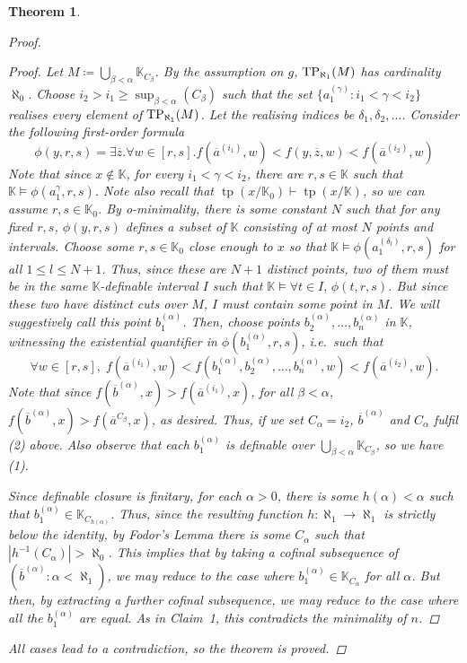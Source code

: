 \documentclass{amsart}
\newtheorem{theorem}{Theorem}
\theoremstyle{remark}
\theoremstyle{definition}
\theoremstyle{plain}
\newcommand{\bK}{\mathbb K}
\newcommand{\oa}{\overline{a}}
\newcommand{\ob}{\overline{b}}
\newcommand{\oz}{\overline{z}}
\DeclareMathOperator{\tp}{\mathrm{tp}}
\theoremstyle{plain}
\begin{document}
\begin{theorem}
\begin{proof}
\begin{proof}
        Let $M \coloneqq \bigcup_{\beta<\alpha} \bK_{C_\beta}$. By the assumption on $g$, $\mathrm{TP}_{\aleph_1}(M)$ has cardinality $\aleph_0$.
        Choose $i_2>i_1\geq \sup_{\beta<\alpha}(C_\beta)$ such that the set $\{a_1^{(\gamma)} : i_1<\gamma<i_2\}$ realises every element of $\mathrm{TP}_{\aleph_1}(M)$. Let the realising indices be $\delta_1,\delta_2, \ldots$. Consider the following first-order formula
        \[
        \phi(y,r,s) = \exists \oz. \forall w \in [r,s]. f(\oa^{(i_1)},w)<f(y,\oz,w)<f(\oa^{(i_2)},w)
        \]
        Note that since $x\notin \bK$, for every $i_1<\gamma<i_2$, there are $r,s \in \bK$ such that $\bK \models \phi(a_1^{\gamma},r,s)$.
        Note also recall that $\tp(x/\bK_0) \vdash \tp(x/\bK)$, so we can assume $r,s \in \bK_0$.
        By o-minimality, there is some constant $N$ such that for any fixed $r,s$, $\phi(y,r,s)$ defines a subset of $\bK$ consisting of at most $N$ points and intervals.
        Choose some $r,s \in \bK_0$ close enough to $x$ so that $\bK \models \phi(a_1^{(\delta_l)},r,s)$ for all $1\leq l \leq N+1$. Thus, since these are $N+1$ distinct points, two of them must be in the same $\bK$-definable interval $I$ such that $\bK \models \forall t \in I,\,\phi(t,r,s)$. But since these two have distinct cuts over $M$, $I$ must contain some point in $M$.
        We will suggestively call this point $b_1^{(\alpha)}$. Then, choose points $b_2^{(\alpha)}, \ldots,  b_n^{(\alpha)}$ in $\bK$, witnessing the existential quantifier in $\phi(b_1^{(\alpha)},r,s)$, i.e.\ such that
        \[\forall w \in [r,s],\; f(\oa^{(i_1)},w)<f(b_1^{(\alpha)}, b_2^{(\alpha)},\ldots, b_{n}^{(\alpha)},w)<f(\oa^{(i_2)},w).
        \]
        Note that since $f(\overline{b}^{(\alpha)},x)>f(\overline{a}^{(i_1)},x)$, for all $\beta<\alpha$, $f(\overline{b}^{(\alpha)},x)>f(\overline{a}^{C_\beta},x)$, as desired. Thus, if we set $C_\alpha=i_2$, $\overline{b}^{(\alpha)}$ and $C_\alpha$ fulfil (2) above. Also observe that each $b_1^{(\alpha)}$ is definable over $\bigcup_{\beta<\alpha} \bK_{C_\beta}$, so we have (1).
        
        Since definable closure is finitary, for each $\alpha>0$, there is some $h(\alpha)<\alpha$ such that $b_1^{(\alpha)}\in\bK_{C_{h(\alpha)}}$. Thus, since the resulting function $h:\aleph_1\to \aleph_1$ is strictly below the identity, by Fodor's Lemma there is some $C_\alpha$ such that $|h^{-1}(C_\alpha)|>\aleph_0$. 
        This implies that by taking a cofinal subsequence of $(\ob^{(\alpha)} : \alpha<\aleph_1)$, we may reduce to the case where $b_1^{(\alpha)}\in \bK_{C_\alpha}$ for all $\alpha$. But then, by extracting a further cofinal subsequence, we may reduce to the case where all the $b_1^{(\alpha)}$ are equal. As in Claim~1, this contradicts the minimality of $n$.
    \end{proof}
    All cases lead to a contradiction, so the theorem is proved.
    \end{proof}
\end{theorem}
\end{document}
